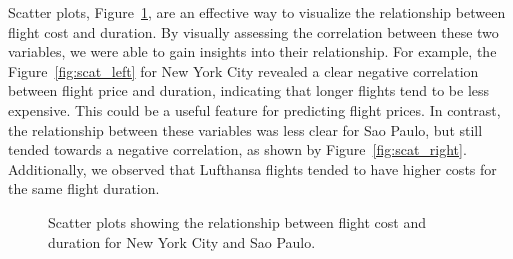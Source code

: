 Scatter plots, Figure~\ref{fig:scatter}, are an effective way to visualize the relationship between flight cost and duration.
By visually assessing the correlation between these two variables, we were able to gain insights into their relationship.
For example, the Figure~\ref{fig:scat_left} for New York City revealed a clear negative correlation between flight price and duration, indicating that longer flights tend to be less expensive.
This could be a useful feature for predicting flight prices. In contrast, the relationship between these variables was less clear for Sao Paulo, but still tended towards a negative correlation, as shown by Figure~\ref{fig:scat_right}.
Additionally, we observed that Lufthansa flights tended to have higher costs for the same flight duration.
\begin{figure}
    \centering
    \caption{Scatter plots showing the relationship between flight cost and duration for New York City and Sao Paulo.}
    \label{fig:scatter}
\end{figure}

